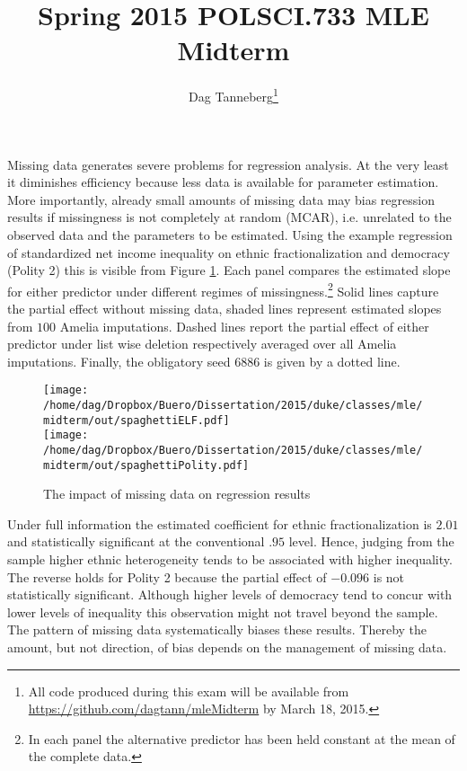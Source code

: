 \documentclass{scrartcl}\usepackage[]{graphicx}\usepackage[]{color}
\title{Spring 2015 POLSCI.733 MLE Midterm}
\author{Dag Tanneberg\thanks{%
    All code produced during this exam will be available 
    from \url{https://github.com/dagtann/mleMidterm}
    by March 18, 2015.
  }
}
\date{}
\begin{document}
 





\maketitle 
\thispagestyle{scrheadings} 

Missing data generates severe problems for regression
analysis. At the very least it diminishes efficiency because
less data is available for parameter estimation. More
importantly, already small amounts of missing data may bias
regression results if missingness is not completely at
random (MCAR), i.e. unrelated to the observed data and the
parameters to be estimated. Using the example regression of
standardized net income inequality on ethnic
fractionalization and democracy (Polity 2) this is visible
from Figure \ref{fig:spaghettiPlots}. Each panel compares
the estimated slope for either predictor under different
regimes of missingness.\footnote{In each panel the
alternative predictor has been held constant at the mean of
the complete data.} Solid lines capture the partial effect
without missing data, shaded lines represent estimated
slopes from $100$ Amelia  imputations. Dashed lines report
the partial effect of either  predictor under list wise
deletion respectively averaged over all Amelia imputations.
Finally, the obligatory seed $6886$ is given by a dotted
line.

\begin{figure}[t]
  \centering
  \caption{The impact of missing data on regression results}
  \label{fig:spaghettiPlots}
  \texttt{[image: /home/dag/Dropbox/Buero/Dissertation/2015/duke/classes/mle/midterm/out/spaghettiELF.pdf]} \\
  \texttt{[image: /home/dag/Dropbox/Buero/Dissertation/2015/duke/classes/mle/midterm/out/spaghettiPolity.pdf]}
\end{figure}

Under full information the estimated coefficient for ethnic
fractionalization is $2.01$ and statistically significant at
the conventional $.95$ level. Hence, judging from the sample
higher ethnic heterogeneity tends to be associated with
higher inequality. The reverse holds for Polity 2 because
the partial effect of $-0.096$ is not statistically
significant. Although higher levels of democracy tend to
concur with lower levels of inequality this observation
might not travel beyond the sample. The pattern of missing
data systematically biases these results. Thereby the
amount, but not direction, of bias depends on the management
of missing data.
\end{document}
